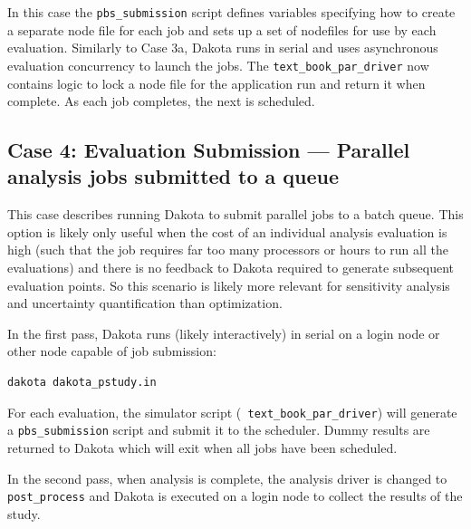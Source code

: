 In this case the {\tt pbs\_submission} script defines variables
specifying how to create a separate node file for each job and sets up
a set of nodefiles for use by each evaluation. Similarly to Case 3a,
Dakota runs in serial and uses asynchronous evaluation concurrency to
launch the jobs.  The {\tt text\_book\_par\_driver} now contains logic
to lock a node file for the application run and return it when
complete.  As each job completes, the next is scheduled.

\subsection{Case 4: Evaluation Submission --- Parallel analysis jobs submitted to a queue}

This case describes running Dakota to submit parallel jobs to a batch
queue.  This option is likely only useful when the cost of an
individual analysis evaluation is high (such that the job requires far
too many processors or hours to run all the evaluations) and there is
no feedback to Dakota required to generate subsequent evaluation
points.  So this scenario is likely more relevant for sensitivity
analysis and uncertainty quantification than optimization.

In the first pass, Dakota runs (likely interactively) in serial on a
login node or other node capable of job submission:
\begin{verbatim}
dakota dakota_pstudy.in
\end{verbatim}
For each evaluation, the simulator script ({\tt
text\_book\_par\_driver}) will generate a {\tt pbs\_submission} script
and submit it to the scheduler.  Dummy results are returned to Dakota
which will exit when all jobs have been scheduled.

In the second pass, when analysis is complete, the analysis driver is
changed to {\tt post\_process} and Dakota is executed on a login node
to collect the results of the study.
